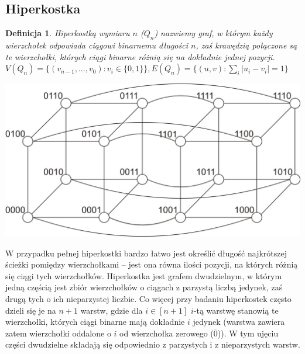 \documentclass{pracamgr}
\newtheorem{defi}[theorem]{Definicja}
\begin{document}
   \subsection{Hiperkostka}
    \begin{defi}\label{hiperkostka}
     \emph{Hiperkostką wymiaru $n$ ($Q_n$)} nazwiemy graf, w którym każdy wierzchołek odpowiada ciągowi binarnemu długości $n$,
     zaś krawędzią połączone są te wierzchołki, których ciągi binarne różnią się na dokładnie jednej pozycji.\newline
     $V(Q_n)=\{(v_{n-1},...,v_{0}):v_i\in\{0,1\}\}, E(Q_n)=\{(u,v):\sum_{i}|u_i-v_i|=1\}$
    \end{defi}
    \begin{center}
     \includegraphics[scale=0.6]{img/Q_4.jpg}
    \end{center}
    W przypadku pełnej hiperkostki
    bardzo łatwo jest określić długość najkrótszej ścieżki pomiędzy wierzchołkami --
    jest ona równa ilości pozycji, na których różnią się ciągi tych wierzchołków.\newline
    Hiperkostka jest grafem dwudzielnym, w którym jedną częścią jest zbiór wierzchołków o ciągach z parzystą liczbą jedynek,
    zaś drugą tych o ich nieparzystej liczbie.\newline
    Co więcej przy badaniu hiperkostek często dzieli się je na $n+1$ warstw, gdzie dla $i\in[n+1]$ $i$-tą warstwę stanowią te wierzchołki,
    których ciągi binarne mają dokładnie $i$ jedynek (warstwa zawiera zatem wierzchołki oddalone o $i$ od wierzchołka zerowego ($\overline{0}$)).
    W tym ujęciu części dwudzielne składają się odpowiednio z parzystych i z nieparzystych warstw.
    
\end{document}
